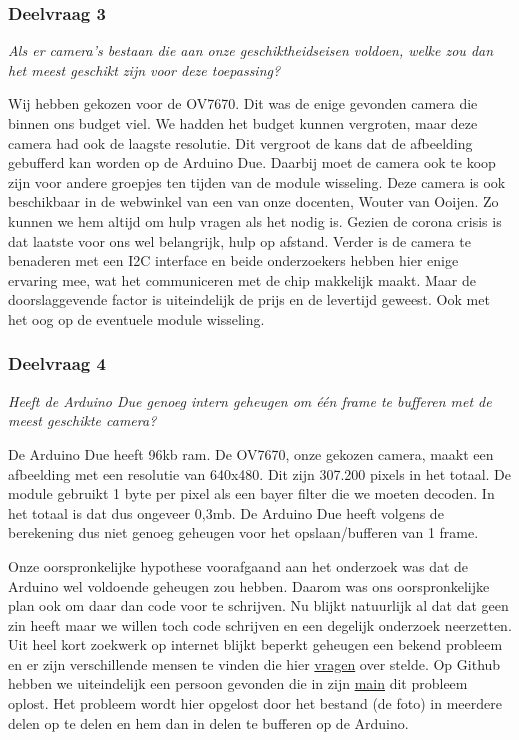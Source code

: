 \documentclass{article}
\begin{document}
\subsubsection{Deelvraag 3}
\textit{Als er camera’s bestaan die aan onze geschiktheidseisen voldoen, welke zou dan het meest geschikt zijn voor deze toepassing? }

Wij hebben gekozen voor de OV7670. Dit was de enige gevonden camera die binnen ons budget viel. We hadden het budget kunnen vergroten, maar deze camera had ook de laagste resolutie. Dit vergroot de kans dat de afbeelding gebufferd kan worden op de Arduino Due. Daarbij moet de camera ook te koop zijn voor andere groepjes ten tijden van de module wisseling.  Deze camera is ook beschikbaar in de webwinkel van een van onze docenten, Wouter van Ooijen. Zo kunnen we hem altijd om hulp vragen als het nodig is. Gezien de corona crisis is dat laatste voor ons wel belangrijk, hulp op afstand. Verder is de camera te benaderen met een I2C interface en beide onderzoekers hebben hier enige ervaring mee, wat het communiceren met de chip makkelijk maakt. Maar de doorslaggevende factor is uiteindelijk de prijs en de levertijd geweest. Ook met het oog op de eventuele module wisseling.

\subsubsection{Deelvraag 4}
\textit{Heeft de Arduino Due genoeg intern geheugen om één frame te bufferen met de meest geschikte camera? }

De Arduino Due heeft 96kb ram. De OV7670, onze gekozen camera, maakt een afbeelding met een resolutie van 640x480. Dit zijn 307.200 pixels in het totaal. De module gebruikt 1 byte per pixel als een bayer filter die we moeten decoden. In het totaal is dat dus ongeveer 0,3mb. De Arduino Due heeft volgens de berekening dus niet genoeg geheugen voor het opslaan/bufferen van 1 frame.

Onze oorspronkelijke hypothese voorafgaand aan het onderzoek was dat de Arduino wel voldoende geheugen zou hebben. Daarom was ons oorspronkelijke plan ook om daar dan code voor te schrijven. Nu blijkt natuurlijk al dat dat geen zin heeft maar we willen toch code schrijven en een degelijk onderzoek neerzetten.
Uit heel kort zoekwerk op internet blijkt beperkt geheugen een bekend probleem en er zijn verschillende mensen te vinden die hier \href{https://forum.arduino.cc/index.php?topic=159557.0}{vragen} over stelde. Op Github hebben we uiteindelijk een persoon gevonden die in zijn \href{https://github.com/ComputerNerd/ov7670-simple/blob/master/main.c}{main} dit probleem oplost. Het probleem wordt hier opgelost door het bestand (de foto) in meerdere delen op te delen en hem dan in delen te bufferen op de Arduino.
\end{document}

